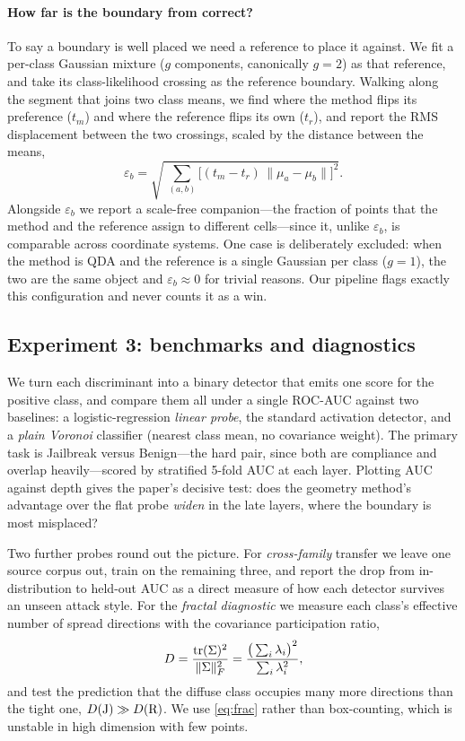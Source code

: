 \paragraph{How far is the boundary from correct?}
To say a boundary is well placed we need a reference to place it against. We fit a per-class
Gaussian mixture ($g$ components, canonically $g = 2$) as that reference, and take its
class-likelihood crossing as the reference boundary. Walking along the segment that joins two
class means, we find where the method flips its preference ($t_m$) and where the reference flips
its own ($t_r$), and report the RMS displacement between the two crossings, scaled by the
distance between the means,
\begin{equation}
  \varepsilon_b = \sqrt{\ \sum_{(a,b)} \Big[(t_m - t_r)\,\|\mu_a - \mu_b\|\Big]^2 }.
  \label{eq:rms}
\end{equation}
Alongside $\varepsilon_b$ we report a scale-free companion---the fraction of points that the
method and the reference assign to different cells---since it, unlike $\varepsilon_b$, is
comparable across coordinate systems. One case is deliberately excluded: when the method is QDA
and the reference is a single Gaussian per class ($g = 1$), the two are the same object and
$\varepsilon_b \approx 0$ for trivial reasons. Our pipeline flags exactly this configuration and
never counts it as a win.

\subsection{Experiment 3: benchmarks and diagnostics}
\label{sec:e3}

We turn each discriminant into a binary detector that emits one score for the positive class, and
compare them all under a single ROC-AUC against two baselines: a logistic-regression
\emph{linear probe}, the standard activation detector, and a \emph{plain Voronoi} classifier
(nearest class mean, no covariance weight). The primary task is Jailbreak versus Benign---the
hard pair, since both are compliance and overlap heavily---scored by stratified 5-fold AUC at
each layer. Plotting AUC against depth gives the paper's decisive test: does the geometry
method's advantage over the flat probe \emph{widen} in the late layers, where the boundary is
most misplaced?

Two further probes round out the picture. For \emph{cross-family} transfer we leave one source
corpus out, train on the remaining three, and report the drop from in-distribution to held-out
AUC as a direct measure of how each detector survives an unseen attack style. For the
\emph{fractal diagnostic} we measure each class's effective number of spread directions with the
covariance participation ratio,
\begin{equation}
  D = \frac{\operatorname{tr}(\Sigma)^2}{\|\Sigma\|_F^2}
    = \frac{\big(\sum_i \lambda_i\big)^2}{\sum_i \lambda_i^2},
  \label{eq:frac}
\end{equation}
and test the prediction that the diffuse class occupies many more directions than the tight one,
$D(\mathrm{J}) \gg D(\mathrm{R})$. We use \eqref{eq:frac} rather than box-counting, which is unstable in high
dimension with few points.

